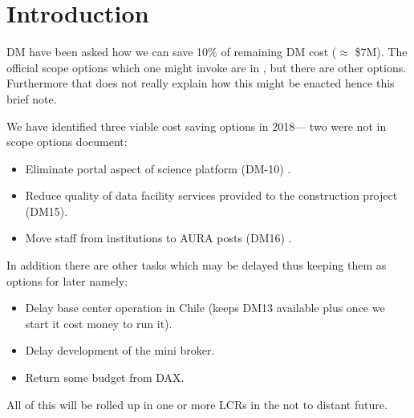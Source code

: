 \section{Introduction}

DM have been  asked  how  we can save 10\% of remaining DM cost  ($\approx$ \$7M).
The official scope options which one might  invoke are in , but there are other options.
Furthermore that does not really explain how this might be enacted hence this brief note.

 We have identified three viable cost saving options in 2018--- two were not in scope options document:
\begin{itemize}
\item Eliminate portal aspect of science platform (DM-10) .
\item Reduce quality of data facility services provided to the construction project (DM15).
\item Move staff from institutions to AURA posts (DM16) .
\end{itemize}

In addition there are other tasks which may be delayed thus keeping them as options for later namely:

\begin{itemize}
\item Delay base center operation in Chile (keeps DM13 available plus once we start it cost money to run it).
\item Delay development of the mini broker.
\item Return some budget from DAX.
\end{itemize}

All of this will be rolled up in one or more LCRs in the not to distant future.

